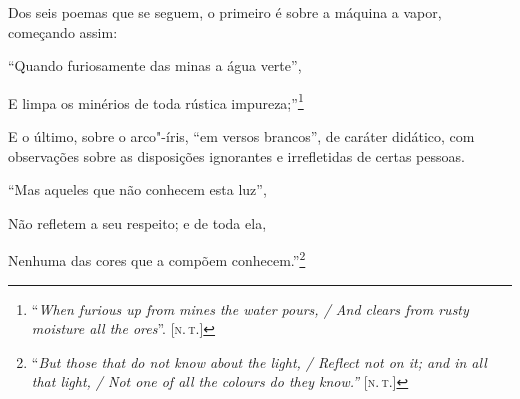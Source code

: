 Dos seis poemas que se seguem, o primeiro é sobre a máquina a vapor,
começando assim:

``Quando furiosamente das minas a água verte'',

E limpa os minérios de toda rústica impureza;''\footnote{``\emph{When
  furious up from mines the water pours, / And clears from rusty
  moisture all the ores}''. {[}\textsc{n.\,t.}{]}}

E o último, sobre o arco"-íris, ``em versos brancos'', de caráter
didático, com observações sobre as disposições ignorantes e irrefletidas
de certas pessoas.

``Mas aqueles que não conhecem esta luz'',

Não refletem a seu respeito; e de toda ela,

Nenhuma das cores que a compõem conhecem.''\footnote{``\emph{But those
  that do not know about the light, / Reflect not on it; and in all that
  light, / Not one of all the colours do they know.''} {[}\textsc{n.\,t.}{]}}


